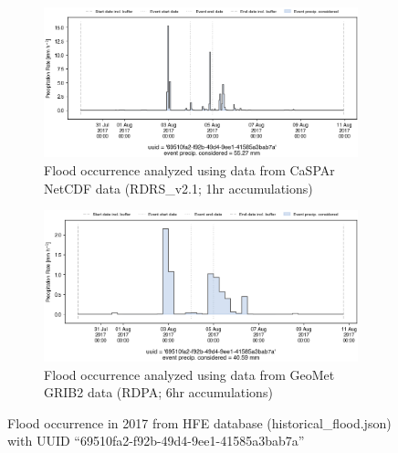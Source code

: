 \documentclass[10pt,a4paper,titlepage,parskip]{scrartcl}
\begin{document}
\begin{figure}[h]
	\begin{subfigure}[a]{1.0\textwidth}
		\centering
		\includegraphics[width=\linewidth]{figures/compare_Geomet_CaSPAr/interpolated_at_stations_occurrence_936_identified-timesteps_RDRS_v2.1.png}
		\caption{Flood occurrence analyzed using data from CaSPAr NetCDF data (RDRS\_v2.1; 1hr accumulations)}
	\end{subfigure}
	\par\bigskip\bigskip
	\begin{subfigure}[b]{1.0\textwidth}
		\centering
		\includegraphics[width=\linewidth]{figures/compare_Geomet_CaSPAr/interpolated_at_stations_occurrence_936_identified-timesteps_rdpa:10km:6f.png}
		\caption{Flood occurrence analyzed using data from GeoMet GRIB2 data (RDPA; 6hr accumulations)}
	\end{subfigure}
	\par\bigskip\bigskip
	\caption{Flood occurrence in 2017 from HFE database (historical\_flood.json) with UUID ``69510fa2-f92b-49d4-9ee1-41585a3bab7a''}
\end{figure}
\pagebreak
\end{document}
